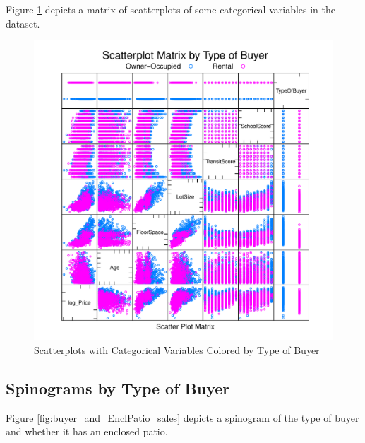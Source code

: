 Figure \ref{fig:slpom_by_buyer} depicts a matrix of scatterplots
of some categorical variables in the dataset.

\begin{figure}[h!]
  \centering
  \includegraphics[scale = 0.5, keepaspectratio=true]{../Figures/slpom_by_buyer}
  \caption{Scatterplots with Categorical Variables Colored by Type of Buyer} \label{fig:slpom_by_buyer}
\end{figure}


\pagebreak

\subsection*{Spinograms by Type of Buyer}

Figure \ref{fig:buyer_and_EnclPatio_sales} depicts a spinogram
of the type of buyer and whether it has an enclosed patio.

